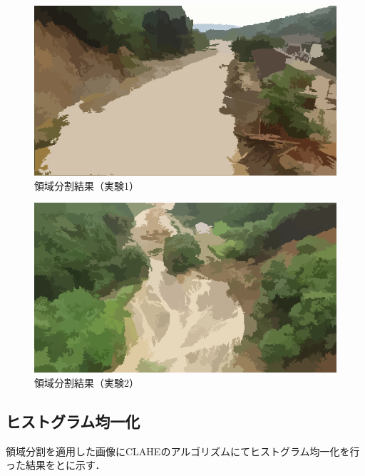 \documentclass[../Thesis]{subfiles}
\begin{document}
\begin{figure}[tbp]
	\centering
	\includegraphics[width=12cm]{img/meanshift1.png}
	\caption{領域分割結果（実験1）}
	\label{img08}
\end{figure}
\begin{figure}[tbp]
	\centering
	\includegraphics[width=12cm]{img/meanshift2.png}
	\caption{領域分割結果（実験2）}
	\label{img09}
\end{figure}


\subsection{ヒストグラム均一化}
領域分割を適用した画像にCLAHEのアルゴリズムにてヒストグラム均一化を行った結果をとに示す．
\end{document}
